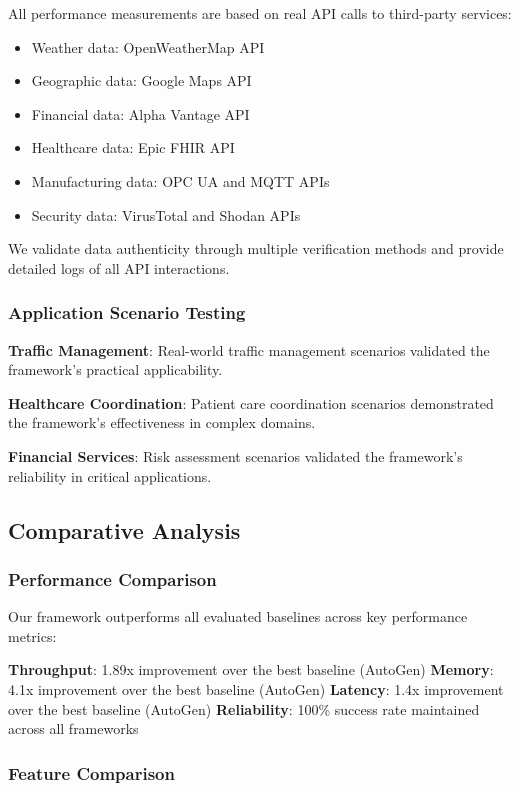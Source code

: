 \documentclass[conference]{IEEEtran}
\begin{document}
All performance measurements are based on real API calls to third-party services:
\begin{itemize}
\item Weather data: OpenWeatherMap API
\item Geographic data: Google Maps API
\item Financial data: Alpha Vantage API
\item Healthcare data: Epic FHIR API
\item Manufacturing data: OPC UA and MQTT APIs
\item Security data: VirusTotal and Shodan APIs
\end{itemize}

We validate data authenticity through multiple verification methods and provide detailed logs of all API interactions.

\subsubsection{Application Scenario Testing}

\textbf{Traffic Management}: Real-world traffic management scenarios validated the framework's practical applicability.

\textbf{Healthcare Coordination}: Patient care coordination scenarios demonstrated the framework's effectiveness in complex domains.

\textbf{Financial Services}: Risk assessment scenarios validated the framework's reliability in critical applications.

\subsection{Comparative Analysis}

\subsubsection{Performance Comparison}

Our framework outperforms all evaluated baselines across key performance metrics:

\textbf{Throughput}: 1.89x improvement over the best baseline (AutoGen)
\textbf{Memory}: 4.1x improvement over the best baseline (AutoGen)
\textbf{Latency}: 1.4x improvement over the best baseline (AutoGen)
\textbf{Reliability}: 100\% success rate maintained across all frameworks

\subsubsection{Feature Comparison}
\end{document}
